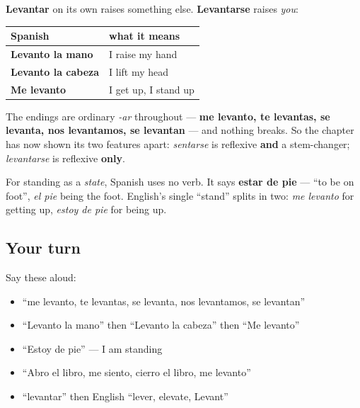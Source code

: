 \begin{grammarlens}[title={Grammar Lens: raising a thing, raising yourself, standing still}]
\textbf{Levantar} on its own raises something else. \textbf{Levantarse} raises \emph{you}:

\noindent
\begin{tabularx}{\linewidth}{@{}>{\raggedright\arraybackslash}X>{\raggedright\arraybackslash}X@{}}
\toprule
\textbf{Spanish} & \textbf{what it means} \\
\midrule
\textbf{Levanto la mano} & I raise my hand \\
\textbf{Levanto la cabeza} & I lift my head \\
\textbf{Me levanto} & I get up, I stand up \\
\bottomrule
\end{tabularx}

The endings are ordinary \emph{-ar} throughout — \textbf{me levanto, te levantas, se levanta, nos levantamos, se levantan} — and nothing breaks. So the chapter has now shown its two features apart: \emph{sentarse} is reflexive \textbf{and} a stem-changer; \emph{levantarse} is reflexive \textbf{only}.

For standing as a \emph{state}, Spanish uses no verb. It says \textbf{estar de pie} — \textquotedblleft{}to be on foot\textquotedblright{}, \emph{el pie} being the foot. English's single \textquotedblleft{}stand\textquotedblright{} splits in two: \emph{me levanto} for getting up, \emph{estoy de pie} for being up.
\end{grammarlens}

\subsection*{Your turn}
Say these aloud:

\begin{itemize}
\raggedright
  \item \textquotedblleft{}me levanto, te levantas, se levanta, nos levantamos, se levantan\textquotedblright{}
  \item \textquotedblleft{}Levanto la mano\textquotedblright{} then \textquotedblleft{}Levanto la cabeza\textquotedblright{} then \textquotedblleft{}Me levanto\textquotedblright{}
  \item \textquotedblleft{}Estoy de pie\textquotedblright{} — I am standing
  \item \textquotedblleft{}Abro el libro, me siento, cierro el libro, me levanto\textquotedblright{}
  \item \textquotedblleft{}levantar\textquotedblright{} then English \textquotedblleft{}lever, elevate, Levant\textquotedblright{}
\end{itemize}

